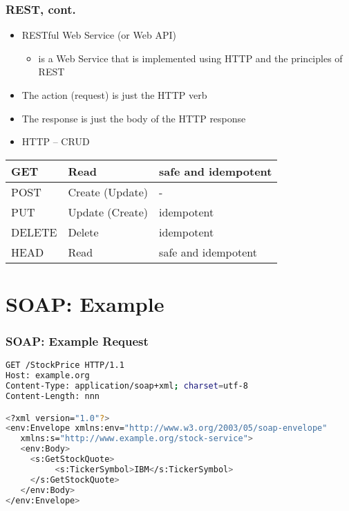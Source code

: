 \documentclass{beamer}
\begin{document}
\begin{frame}[fragile]\frametitle{REST, cont.} 

  \begin{itemize}
    \item RESTful Web Service (or Web API)
    \begin{itemize}
      \item is a Web Service that is implemented using HTTP and the principles of REST
    \end{itemize}
    
    \item The action (request) is just the HTTP verb
    \item The response is just the body of the HTTP response
    \item HTTP -- CRUD
  \end{itemize}
  
  \begin{center}
    \begin{tabular}{|l|l|l|}
\hline 
GET & Read & safe and idempotent \\ 
\hline 
POST & Create (Update) & - \\ 
\hline 
PUT & Update (Create) & idempotent \\ 
\hline 
DELETE & Delete & idempotent \\ 
\hline 
HEAD & Read & safe and idempotent  \\ 
\hline 
    \end{tabular}
  \end{center}
    
\end{frame}



\section{SOAP: Example} 
\begin{frame}[fragile]\frametitle{SOAP: Example Request} 

  \begin{lstlisting}[language=bash, escapechar={^}]
GET /StockPrice HTTP/1.1
Host: example.org
Content-Type: application/soap+xml; charset=utf-8
Content-Length: nnn

<?xml version="1.0"?>
<env:Envelope xmlns:env="http://www.w3.org/2003/05/soap-envelope"
   xmlns:s="http://www.example.org/stock-service">
   <env:Body>
     <s:GetStockQuote>
          <s:TickerSymbol>IBM</s:TickerSymbol>
     </s:GetStockQuote>
   </env:Body>
</env:Envelope>
  \end{lstlisting}

\end{frame}
\end{document}
